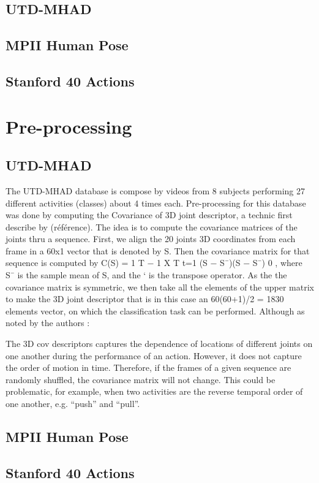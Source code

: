 \documentclass{article}
\begin{document}
\subsection{UTD-MHAD}
\subsection{MPII Human Pose}
\subsection{Stanford 40 Actions}

\section{Pre-processing}
\subsection{UTD-MHAD}
The UTD-MHAD database is compose by videos from 8 subjects performing 27 different activities (classes) about 4 times each. Pre-processing for this database was done by computing the Covariance of 3D joint descriptor, a technic first describe by (référence).  The idea is to compute the covariance matrices of the joints thru a sequence.  First, we align the 20 joints 3D coordinates from each frame in a 60x1 vector that is denoted by S.  Then the covariance matrix for that sequence is computed by   C(S) = 1 T − 1 X T t=1 (S − S¯)(S − S¯) 0 , where S¯ is the sample mean of S, and the ‘ is the transpose operator.  As the the covariance matrix is symmetric, we then take all the elements of the upper matrix to make the 3D joint descriptor that is in this case an 60(60+1)/2 = 1830 elements vector, on which the classification task can be performed.   Although as noted by the authors :

The 3D cov descriptors captures the dependence of locations
of different joints on one another during the performance of
an action. However, it does not capture the order of motion
in time. Therefore, if the frames of a given sequence are randomly
shuffled, the covariance matrix will not change. This
could be problematic, for example, when two activities are
the reverse temporal order of one another, e.g. “push” and “pull”.

\subsection{MPII Human Pose}
\subsection{Stanford 40 Actions}
\end{document}
